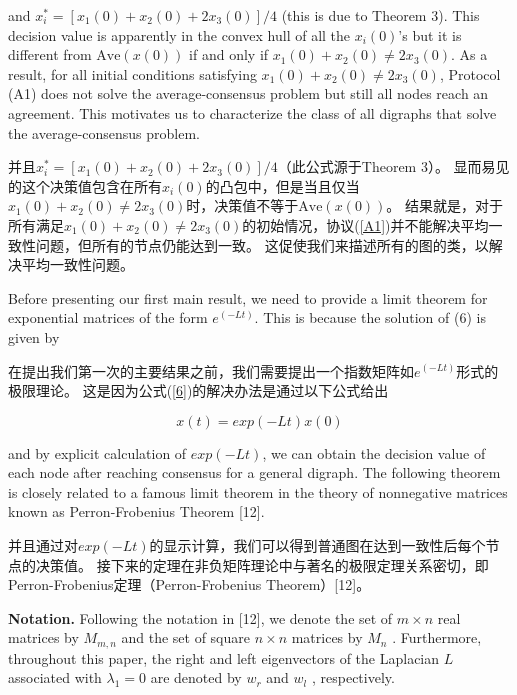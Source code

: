 \documentclass{article}
\begin{document}
{\color[gray]{0.5}
\noindent and $x^*_i = [x_1(0) + x_2(0) + 2x_3(0)]/4$ (this is due to Theorem 3). 
This decision value is apparently in the convex hull of all the $x_i(0)$’s but it is diﬀerent from $\text{Ave}(x(0))$ if and only if $x_1(0) + x_2(0) \ne 2x_3(0)$. 
As a result, for all initial conditions satisfying $x_1(0) + x_2(0) \ne 2x_3(0)$, Protocol (A1) does not solve the average-consensus problem but still all nodes reach an agreement. 
This motivates us to characterize the class of all digraphs that solve the average-consensus problem.
}

\noindent 并且$x^*_i = [x_1(0) + x_2(0) + 2x_3(0)]/4$（此公式源于Theorem 3）。
显而易见的这个决策值包含在所有$x_i(0)$的凸包中，但是当且仅当$x_1(0) + x_2(0) \ne 2x_3(0)$时，决策值不等于$\text{Ave}(x(0))$。
结果就是，对于所有满足$x_1(0) + x_2(0) \ne 2x_3(0)$的初始情况，协议(\ref{A1})并不能解决平均一致性问题，但所有的节点仍能达到一致。
这促使我们来描述所有的图的类，以解决平均一致性问题。

{\color[gray]{0.5}
Before presenting our ﬁrst main result, we need to provide a limit theorem for exponential matrices of the form $e^{(-Lt)}$. 
This is because the solution of (6) is given by
}

在提出我们第一次的主要结果之前，我们需要提出一个指数矩阵如$e^{(-Lt)}$形式的极限理论。
这是因为公式(\ref{6})的解决办法是通过以下公式给出

\begin{equation}
    x(t) = exp(-Lt)x(0)
    \tag{17}
    \label{17}
\end{equation}

{\color[gray]{0.5}
\noindent and by explicit calculation of $exp(-Lt)$, we can obtain the decision value of each node after reaching consensus for a general digraph. 
The following theorem is closely related to a famous limit theorem in the theory of nonnegative matrices known as Perron-Frobenius Theorem [12].
}

\noindent 并且通过对$exp(-Lt)$的显示计算，我们可以得到普通图在达到一致性后每个节点的决策值。
接下来的定理在非负矩阵理论中与著名的极限定理关系密切，即Perron-Frobenius定理（Perron-Frobenius Theorem）[12]。

{\color[gray]{0.5}
\noindent \textbf{Notation.} Following the notation in [12], we denote the set of $m\times n$ real matrices by $M_{m,n}$  and the set of square $n\times n$ matrices by $M_n$ . 
Furthermore, throughout this paper, the right and left eigenvectors of the Laplacian $L$ associated with $\lambda_1 = 0$ are denoted by $w_r$ and $w_l$ , respectively.
}
\end{document}
